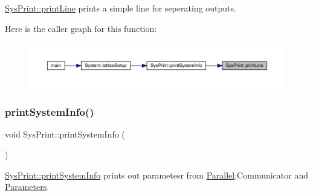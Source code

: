 \mbox{\hyperlink{class_sys_print_abdf8282e73cc002e5e572c6f09266cc9}{Sys\+Print\+::print\+Line}} prints a simple line for seperating outputs. 

Here is the caller graph for this function\+:\nopagebreak
\begin{figure}[H]
\begin{center}
\leavevmode
\includegraphics[width=350pt]{class_sys_print_abdf8282e73cc002e5e572c6f09266cc9_icgraph}
\end{center}
\end{figure}
\mbox{\label{class_sys_print_a4572572643f6f4685081a3ae419e5ca9}} 
\subsubsection{\texorpdfstring{printSystemInfo()}{printSystemInfo()}}
{\footnotesize\ttfamily void Sys\+Print\+::print\+System\+Info (\begin{DoxyParamCaption}{ }\end{DoxyParamCaption})\hspace{0.3cm}{\ttfamily [static]}}



\mbox{\hyperlink{class_sys_print_a4572572643f6f4685081a3ae419e5ca9}{Sys\+Print\+::print\+System\+Info}} prints out parametesr from \mbox{\hyperlink{namespace_parallel}{Parallel}}\+:Communicator and \mbox{\hyperlink{class_parameters}{Parameters}}. 

